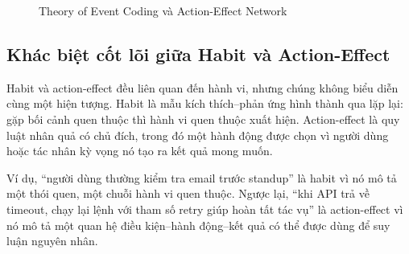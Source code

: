 \documentclass[../main.tex]{subfiles}
\begin{document}
\begin{figure}[H]
\centering
{}
\caption{Theory of Event Coding và Action-Effect Network}
\label{fig:ch4_tec_network}
\end{figure}

\subsection{Khác biệt cốt lõi giữa Habit và Action-Effect}

Habit và action-effect đều liên quan đến hành vi, nhưng chúng không biểu diễn cùng một hiện tượng. Habit là mẫu kích thích--phản ứng hình thành qua lặp lại: gặp bối cảnh quen thuộc thì hành vi quen thuộc xuất hiện. Action-effect là quy luật nhân quả có chủ đích, trong đó một hành động được chọn vì người dùng hoặc tác nhân kỳ vọng nó tạo ra kết quả mong muốn.

Ví dụ, ``người dùng thường kiểm tra email trước standup'' là habit vì nó mô tả một thói quen, một chuỗi hành vi quen thuộc. Ngược lại, ``khi API trả về timeout, chạy lại lệnh với tham số retry giúp hoàn tất tác vụ'' là action-effect vì nó mô tả một quan hệ điều kiện--hành động--kết quả có thể được dùng để suy luận nguyên nhân.
\end{document}
